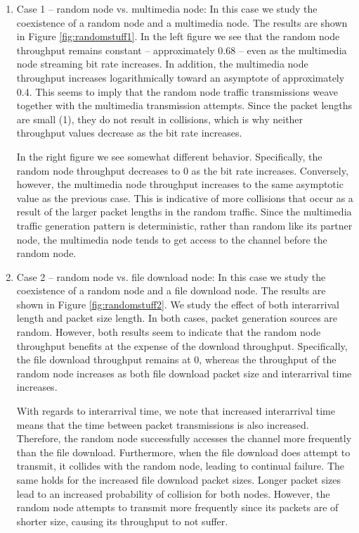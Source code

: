 \documentclass{llncs}
\begin{document}
\begin{enumerate}
	\item Case 1 -- random node vs. multimedia node: In this case we study the coexistence of a random node and a multimedia node. The results are shown in Figure \ref{fig:randomstuff1}. In the left figure we see that the random node throughput remains constant -- approximately 0.68 -- even as the multimedia node streaming bit rate increases. In addition, the multimedia node throughput increases logarithmically toward an asymptote of approximately 0.4. This seems to imply that the random node traffic transmissions weave together with the multimedia transmission attempts. Since the packet lengths are small (1), they do not result in collisions, which is why neither throughput values decrease as the bit rate increases.

	In the right figure we see somewhat different behavior. Specifically, the random node throughput decreases to 0 as the bit rate increases. Conversely, however, the multimedia node throughput increases to the same asymptotic value as the previous case. This is indicative of more collisions that occur as a result of the larger packet lengths in the random traffic. Since the multimedia traffic generation pattern is deterministic, rather than random like its partner node, the multimedia node tends to get access to the channel before the random node. 

	\item Case 2 -- random node vs. file download node: In this case we study the coexistence of a random node and a file download node. The results are shown in Figure \ref{fig:randomstuff2}. We study the effect of both interarrival length and packet size length. In both cases, packet generation sources are random. However, both results seem to indicate that the random node throughput benefits at the expense of the download throughput. Specifically, the file download throughput remains at 0, whereas the throughput of the random node increases as both file download packet size and interarrival time increases. 

	With regards to interarrival time, we note that increased interarrival time means that the time between packet transmissions is also increased. Therefore, the random node successfully accesses the channel more frequently than the file download. Furthermore, when the file download does attempt to transmit, it collides with the random node, leading to continual failure. The same holds for the increased file download packet sizes. Longer packet sizes lead to an increased probability of collision for both nodes. However, the random node attempts to transmit more frequently since its packets are of shorter size, causing its throughput to not suffer.


\end{enumerate}
\end{document}
